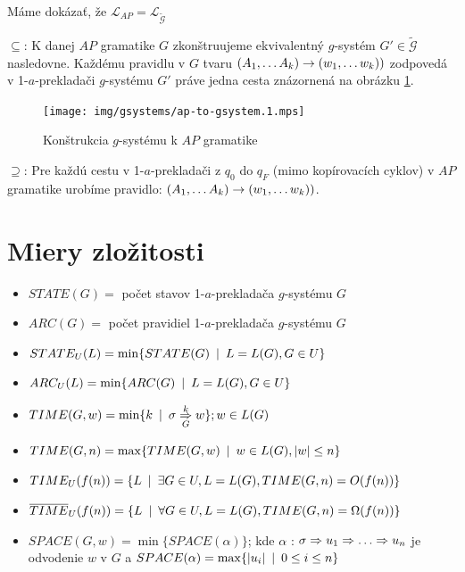 \begin{dokaz}
  Máme dokázať, že
  $\mathcal{L}_{AP}=\mathcal{L}_{\tilde{\mathcal{G}}}$
  \begin{description}
    \item{$\subseteq$:} K danej $AP$ gramatike $G$ zkonštruujeme ekvivalentný $g$-systém
      $G'\in\tilde{\mathcal{G}}$ nasledovne. Každému pravidlu v $G$
      tvaru $(A_1,\dots A_k)\rightarrow (w_1,\dots w_k))$ zodpovedá v
      1-$a$-prekladači $g$-systému $G'$ práve jedna cesta znázornená na
      obrázku \ref{fig:ap-to-gsystem}.

      \begin{figure}[!ht]
          \centering
          \texttt{[image: img/gsystems/ap-to-gsystem.1.mps]}
          \caption{Konštrukcia $g$-systému k $AP$ gramatike}
          \label{fig:ap-to-gsystem}
      \end{figure}

    \item{$\supseteq$:} Pre každú cestu v 1-$a$-prekladači z $q_0$ do $q_F$
      (mimo kopírovacích cyklov) v $AP$ gramatike urobíme pravidlo:
      $(A_1,\dots A_k)\rightarrow (w_1,\dots w_k))$.
  \end{description}
\end{dokaz}

\section{Miery zložitosti}

\begin{itemize}
  \item $STATE(G)=$ počet stavov 1-$a$-prekladača $g$-systému $G$
  \item $ARC(G)=$ počet pravidiel 1-$a$-prekladača $g$-systému $G$
  \item $STATE_U(L)=\min\{ STATE(G)\enspace |\enspace L=L(G), G\in U\}$
  \item $ARC_U(L)=\min\{ ARC(G)\enspace |\enspace L=L(G), G\in U\}$
  \item $TIME(G,w)=\min\{ k\enspace |\enspace\sigma\overset{k}{\underset{G}{\Rightarrow}} w\}; w\in L(G)$
  \item $TIME(G,n)=\max\{ TIME(G,w)\enspace |\enspace w\in L(G), |w|\leq n\}$
  \item $TIME_U(f(n))=\{ L \enspace |\enspace \exists G\in U, L=L(G), TIME(G,n)=O(f(n))\}$
  \item $\overline{TIME}_U(f(n))=\{ L\enspace |\enspace\forall G\in U, L=L(G), TIME(G,n)=\Omega(f(n))\}$
  \item $SPACE(G,w)=\min\{ SPACE(\alpha )\}$; kde $\alpha$ : $\sigma\Ra u_1\Ra\dots\Ra u_n$ je odvodenie $w$ v $G$
  a $SPACE(\alpha)=\max\{|u_i|\enspace |\enspace 0\leq i\leq n\}$
\end{itemize}

